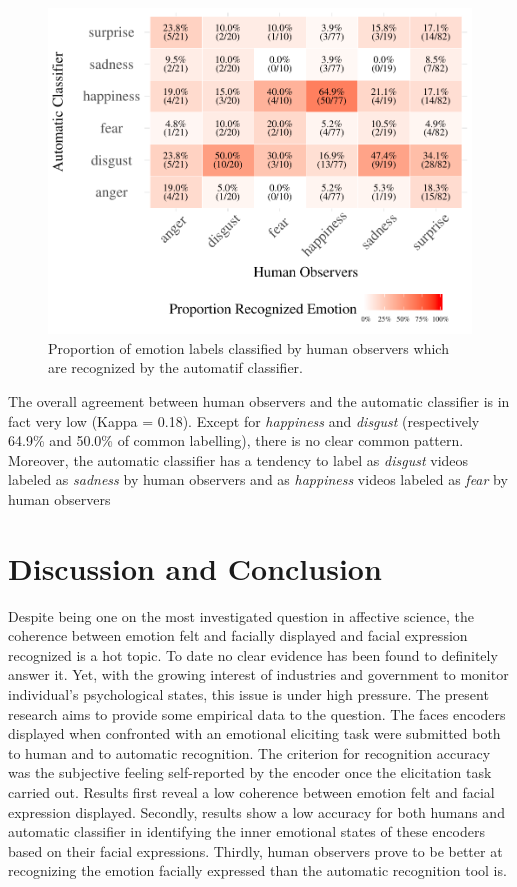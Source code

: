 \documentclass[conference,final,]{IEEEtran}
\makeatletter
\def\maxwidth{\ifdim\Gin@nat@width>\linewidth\linewidth
\else\Gin@nat@width\fi}
\let\Oldincludegraphics\includegraphics
\renewcommand{\includegraphics}[1]{\Oldincludegraphics[width=\maxwidth]{#1}}
\makeatother
\begin{document}
\begin{figure}
\centering
\includegraphics{ACII_2019_paper_files/figure-latex/confusionMatrix_hr_ar-1.pdf}
\caption{\label{fig:confusionMatrix_hr_ar}Proportion of emotion labels
classified by human observers which are recognized by the automatif
classifier.}
\end{figure}

The overall agreement between human observers and the automatic
classifier is in fact very low (Kappa = 0.18). Except for
\emph{happiness} and \emph{disgust} (respectively 64.9\% and 50.0\% of
common labelling), there is no clear common pattern. Moreover, the
automatic classifier has a tendency to label as \emph{disgust} videos
labeled as \emph{sadness} by human observers and as \emph{happiness}
videos labeled as \emph{fear} by human observers

\hypertarget{discussion-and-conclusion}{%
\section{Discussion and Conclusion}\label{discussion-and-conclusion}}

Despite being one on the most investigated question in affective
science, the coherence between emotion felt and facially displayed and
facial expression recognized is a hot topic. To date no clear evidence
has been found to definitely answer it. Yet, with the growing interest
of industries and government to monitor individual's psychological
states, this issue is under high pressure. The present research aims to
provide some empirical data to the question. The faces encoders
displayed when confronted with an emotional eliciting task were
submitted both to human and to automatic recognition. The criterion for
recognition accuracy was the subjective feeling self-reported by the
encoder once the elicitation task carried out. Results first reveal a
low coherence between emotion felt and facial expression displayed.
Secondly, results show a low accuracy for both humans and automatic
classifier in identifying the inner emotional states of these encoders
based on their facial expressions. Thirdly, human observers prove to be
better at recognizing the emotion facially expressed than the automatic
recognition tool is.
\end{document}
